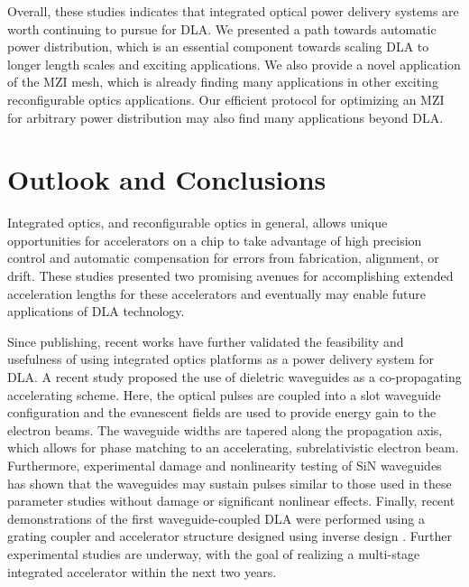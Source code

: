 Overall, these studies indicates that integrated optical power delivery systems are worth continuing to pursue for DLA.  We presented a path towards automatic power distribution, which is an essential component towards scaling DLA to longer length scales and exciting applications.  We also provide a novel application of the MZI mesh, which is already finding many applications in other exciting reconfigurable optics applications.  Our efficient protocol for optimizing an MZI for arbitrary power distribution may also find many applications beyond DLA.

\section{\label{sec:discussion}Outlook and Conclusions}


Integrated optics, and reconfigurable optics in general, allows unique opportunities for accelerators on a chip to take advantage of high precision control and automatic compensation for errors from fabrication, alignment, or drift. These studies presented two promising avenues for accomplishing extended acceleration lengths for these accelerators and eventually may enable future applications of DLA technology.

Since publishing, recent works have further validated the feasibility and usefulness of using integrated optics platforms as a power delivery system for DLA. A recent study \cite{zhao_design_2018} proposed the use of dieletric waveguides as a co-propagating accelerating scheme.  Here, the optical pulses are coupled into a slot waveguide configuration and the evanescent fields are used to provide energy gain to the electron beams.  The waveguide widths are tapered along the propagation axis, which allows for phase matching to an accelerating, subrelativistic electron beam.  
Furthermore, experimental damage and nonlinearity testing of SiN waveguides has shown that the waveguides may sustain pulses similar to those used in these parameter studies \cite{tan2019silicon} without damage or significant nonlinear effects.
Finally, recent demonstrations of the first waveguide-coupled DLA were performed using a grating coupler and accelerator structure designed using inverse design \cite{sapra2019inverse,sapra_-chip_2019}.
Further experimental studies are underway, with the goal of realizing a multi-stage integrated accelerator within the next two years.
